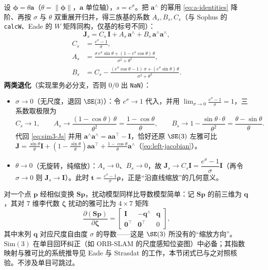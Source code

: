 \begin{derivation}
设 $\boldsymbol{\phi}=\theta\mathbf{a}$（$\theta=\|\boldsymbol{\phi}\|$，$\mathbf{a}$ 单位轴），$s=e^{\sigma}$。把 $\mathbf{a}^\wedge$ 的幂用 \cref{eq:a-identities} 降阶、再按 $\sigma$ 与 $\theta$ 双重展开归并，得三族基的系数 $A_s,B_s,C_s$（与 Sophus 的 \texttt{calcW}、Eade\cite{eade2017lie} 的 $W$ 矩阵同构，仅基的标号不同）：
\begin{equation}
  \mathbf{J}_s
  =C_s\,\mathbf{I}+A_s\,\mathbf{a}^\wedge+B_s\,\mathbf{a}^\wedge\mathbf{a}^\wedge,
  \label{eq:sim3-Js}
\end{equation}
\begin{align*}
  C_s&=\frac{e^{\sigma}-1}{\sigma},\\
  A_s&=\frac{\sigma\,e^{\sigma}\sin\theta+(1-e^{\sigma}\cos\theta)\,\theta}{\sigma^2+\theta^2},\\
  B_s&=C_s-\frac{(e^{\sigma}\cos\theta-1)\,\sigma+(e^{\sigma}\sin\theta)\,\theta}{\sigma^2+\theta^2}.
\end{align*}
\textbf{两类退化}（实现里务必分支，否则 $0/0$ 出 \texttt{NaN}）：
\begin{itemize}
  \item $\sigma\to0$（无尺度，退回 $\SE(3)$）：令 $e^{\sigma}\to1$ 代入，并用 $\lim_{\sigma\to0}\tfrac{e^\sigma-1}{\sigma}=1$，三系数取极限为
  \[
    C_s\to1,\qquad
    A_s\to\frac{(1-\cos\theta)\,\theta}{\theta^2}=\frac{1-\cos\theta}{\theta},\qquad
    B_s\to1-\frac{\sin\theta\cdot\theta}{\theta^2}=\frac{\theta-\sin\theta}{\theta}.
  \]
  代回 \cref{eq:sim3-Js} 并用 $\mathbf{a}^\wedge\mathbf{a}^\wedge=\mathbf{a}\mathbf{a}^\top-\mathbf{I}$，恰好还原 $\SE(3)$ 左雅可比 $\mathbf{J}=\tfrac{\sin\theta}{\theta}\mathbf{I}+(1-\tfrac{\sin\theta}{\theta})\mathbf{a}\mathbf{a}^\top+\tfrac{1-\cos\theta}{\theta}\mathbf{a}^\wedge$（\cref{eq:left-jacobian}）。
  \item $\theta\to0$（无旋转，纯缩放）：$A_s\to0$、$B_s\to0$，故 $\mathbf{J}_s\to C_s\mathbf{I}=\dfrac{e^{\sigma}-1}{\sigma}\mathbf{I}$（再令 $\sigma\to0$ 则 $\mathbf{J}_s\to\mathbf{I}$）。此时 $\mathbf{t}=\tfrac{e^\sigma-1}{\sigma}\boldsymbol{\rho}$，正是“沿直线缩放”的几何意义。
\end{itemize}
\end{derivation}

\noindent 对一个点 $\mathbf{p}$ 经相似变换 $\mathbf{S}\mathbf{p}$，扰动模型同样比导数模型简单：记 $\mathbf{S}\mathbf{p}$ 的前三维为 $\mathbf{q}$，其对 $7$ 维李代数 $\boldsymbol{\zeta}$ 扰动的雅可比为 $4\times7$ 矩阵
\begin{equation}
  \frac{\partial(\mathbf{S}\mathbf{p})}{\partial\boldsymbol{\zeta}}
  =\begin{bmatrix}\mathbf{I}&-\mathbf{q}^\wedge&\mathbf{q}\\\mathbf{0}^\top&\mathbf{0}^\top&0\end{bmatrix},
  \label{eq:sim3-pert}
\end{equation}
其中末列 $\mathbf{q}$ 对应尺度自由度 $\sigma$ 的导数——这是 $\SE(3)$ 所没有的“缩放方向”。$\mathrm{Sim}(3)$ 在单目回环纠正（如 ORB-SLAM 的尺度感知位姿图）中必备；其指数映射与雅可比的系统推导见 Eade\cite{eade2017lie} 与 Strasdat 的工作\cite{strasdat2012thesis}，本节闭式已与之对照核验。不涉及单目可跳过。

